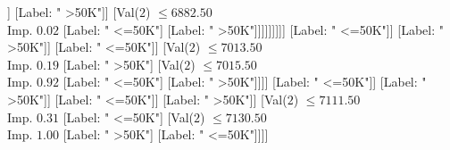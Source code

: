 \documentclass[margin=10pt]{standalone}
\begin{document}
\begin{forest}
																																													[Val($2$) $ \leq 6766.50$ \\ Imp. $0.11$
																																														[Label: " <=50K"]
																																														[Val($2$) $ \leq 6804.50$ \\ Imp. $0.11$
																																															[Label: " >50K"]
																																															[Val($2$) $ \leq 6812.50$ \\ Imp. $0.14$
																																																[Label: " <=50K"]
																																																[Val($2$) $ \leq 6845.50$ \\ Imp. $0.06$
																																																	[Val($2$) $ \leq 6826.50$ \\ Imp. $0.31$
																																																		[Val($2$) $ \leq 6823.50$ \\ Imp. $1.00$
																																																			[Label: " >50K"]
																																																			[Label: " <=50K"]]
																																																		[Label: " >50K"]]
																																																	[Val($2$) $ \leq 6882.50$ \\ Imp. $0.02$
																																																		[Label: " <=50K"]
																																																		[Label: " >50K"]]]]]]]]]
																																										[Label: " <=50K"]]
																																									[Label: " >50K"]]
																																								[Label: " <=50K"]]
																																							[Val($2$) $ \leq 7013.50$ \\ Imp. $0.19$
																																								[Label: " >50K"]
																																								[Val($2$) $ \leq 7015.50$ \\ Imp. $0.92$
																																									[Label: " <=50K"]
																																									[Label: " >50K"]]]]
																																						[Label: " <=50K"]]
																																					[Label: " >50K"]]
																																				[Label: " <=50K"]]
																																			[Label: " >50K"]]
																																		[Val($2$) $ \leq 7111.50$ \\ Imp. $0.31$
																																			[Label: " <=50K"]
																																			[Val($2$) $ \leq 7130.50$ \\ Imp. $1.00$
																																				[Label: " >50K"]
																																				[Label: " <=50K"]]]]

\end{forest}
\end{document}
